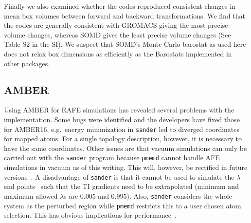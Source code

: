 \documentclass[journal=jctcce,manuscript=article]{achemso}
\newcommand{\progname}[1]{\texttt{#1}}
\begin{document}
\begin{table}[]
  \begin{minipage}{\linewidth}
    \caption{Cycle closure errors (in \si{kcal.mol^{-1}}) for  ethane$ \rightarrow$ methanol $\rightarrow$ methane
$\rightarrow$ ethane}\label{tab:cycle-closure}
  \end{minipage}
\end{table}

Finally we also examined whether the codes reproduced consistent changes in mean box volumes between forward and backward transformations. We find that the codes are generally consistent with GROMACS giving the most precise volume changes, whereas SOMD gives the least precise volume changes (See Table S2 in the SI). We suspect that SOMD's Monte Carlo barostat as used here does not relax box dimensions as efficiently as the Barostats implemented in other packages.

\subsection{AMBER}
\label{sec:amber-results}

Using AMBER for RAFE simulations has revealed several problems with the implementation.  Some bugs were identified and the developers have fixed those for AMBER16, e.g.\ energy minimization in \progname{sander} led to
diverged coordinates for mapped atoms.  For a single topology description,
however, it is necessary to have the same coordinates.  Other issues are that
vacuum simulations can only be carried out with the \progname{sander} program
because \progname{pmemd} cannot handle AFE simulations in vacuum as of this writing.  This will, however, be rectified in future
versions~\cite{doi:10.1021/acs.jctc.7b00102}.  A disadvantage of
\progname{sander} is that it cannot be used to simulate the $\lambda$ end
points~\cite{doi:10.1021/ct400340s} such that the TI gradients need to be
extrapolated (minimum and maximum allowed $\lambda$s are 0.005 and 0.995).
Also, \progname{sander} considers the whole system as the perturbed
region while \progname{pmemd} restricts this to a user chosen atom selection.
This has obvious implications for performance~\cite{doi:10.1021/ct400340s}.
\end{document}
